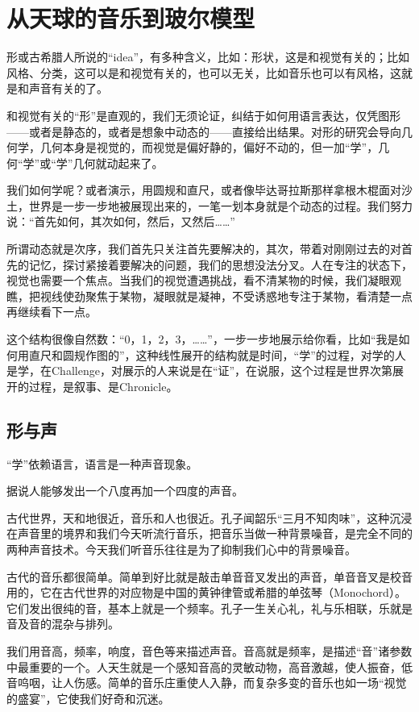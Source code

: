 \section{从天球的音乐到玻尔模型}

形或古希腊人所说的“idea”，有多种含义，比如：形状，这是和视觉有关的；比如风格、分类，这可以是和视觉有关的，也可以无关，比如音乐也可以有风格，这就是和声音有关的了。

和视觉有关的“形”是直观的，我们无须论证，纠结于如何用语言表达，仅凭图形——或者是静态的，或者是想象中动态的——直接给出结果。对形的研究会导向几何学，几何本身是视觉的，而视觉是偏好静的，偏好不动的，但一加“学”，几何“学”或“学”几何就动起来了。

我们如何学呢？或者演示，用圆规和直尺，或者像毕达哥拉斯那样拿根木棍面对沙土，世界是一步一步地被展现出来的，一笔一划本身就是个动态的过程。我们努力说：“首先如何，其次如何，然后，又然后……”

所谓动态就是次序，我们首先只关注首先要解决的，其次，带着对刚刚过去的对首先的记忆，探讨紧接着要解决的问题，我们的思想没法分叉。人在专注的状态下，视觉也需要一个焦点。当我们的视觉遭遇挑战，看不清某物的时候，我们凝眼观瞧，把视线使劲聚焦于某物，凝眼就是凝神，不受诱惑地专注于某物，看清楚一点再继续看下一点。

这个结构很像自然数：“0，1，2，3，……”，一步一步地展示给你看，比如“我是如何用直尺和圆规作图的”，这种线性展开的结构就是时间，“学”的过程，对学的人是学，在Challenge，对展示的人来说是在“证”，在说服，这个过程是世界次第展开的过程，是叙事、是Chronicle。

\subsection{形与声}

“学”依赖语言，语言是一种声音现象。

据说人能够发出一个八度再加一个四度的声音。

古代世界，天和地很近，音乐和人也很近。孔子闻韶乐“三月不知肉味”，这种沉浸在声音里的境界和我们今天听流行音乐，把音乐当做一种背景噪音，是完全不同的两种声音技术。今天我们听音乐往往是为了抑制我们心中的背景噪音。

古代的音乐都很简单。简单到好比就是敲击单音音叉发出的声音，单音音叉是校音用的，它在古代世界的对应物是中国的黄钟律管或希腊的单弦琴（Monochord）。它们发出很纯的音，基本上就是一个频率。孔子一生关心礼，礼与乐相联，乐就是音及音的混杂与排列。

我们用音高，频率，响度，音色等来描述声音。音高就是频率，是描述“音”诸参数中最重要的一个。人天生就是一个感知音高的灵敏动物，高音激越，使人振奋，低音呜咽，让人伤感。简单的音乐庄重使人入静，而复杂多变的音乐也如一场“视觉的盛宴”，它使我们好奇和沉迷。


